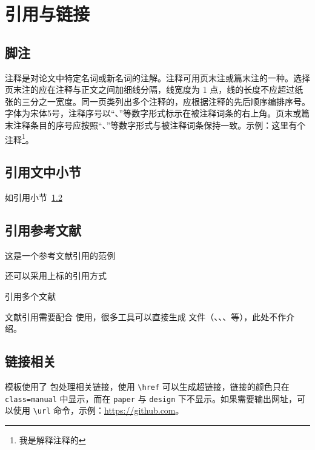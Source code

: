 
\chapter{引用与链接}

\section{脚注}
注释是对论文中特定名词或新名词的注解。注释可用页末注或篇末注的一种。选择页末注的应在注释与正文之间加细线分隔，线宽度为 1 点，线的长度不应超过纸张的三分之一宽度。同一页类列出多个注释的，应根据注释的先后顺序编排序号。字体为宋体5号，注释序号以“、”等数字形式标示在被注释词条的右上角。页末或篇末注释条目的序号应按照“、”等数字形式与被注释词条保持一致。示例：这里有个注释\footnote{我是解释注释的}。

\section{引用文中小节}\label{sec:ref}
如引用小节~\ref{sec:ref}

\section{引用参考文献}
这是一个参考文献引用的范例\cite{kuhn2004man}

还可以采用上标的引用方式

引用多个文献\cite{kuhn2004man,江泽民2008新时期我国信息技术产业的发展,江泽民1989能源发展趋势及主要节能措施}

文献引用需要配合  使用，很多工具可以直接生成  文件（、、、等），此处不作介绍。

\section{链接相关}
模板使用了  包处理相关链接，使用 \verb|\href| 可以生成超链接，链接的颜色只在 \verb|class=manual| 中显示，而在 \verb|paper| 与 \verb|design| 下不显示。如果需要输出网址，可以使用 \verb|\url| 命令，示例：\url{https://github.com}。